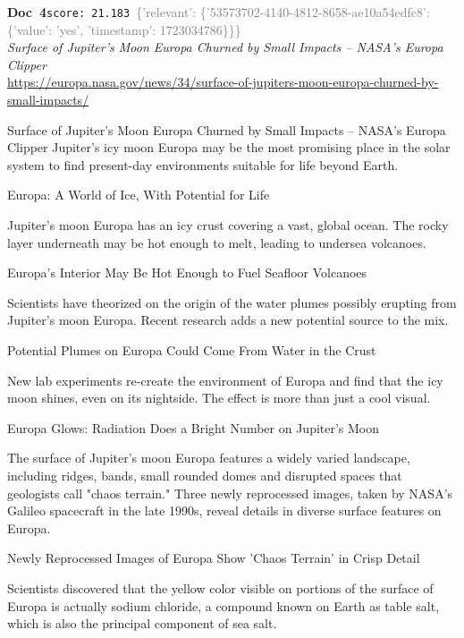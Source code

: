 \documentclass[a4paper,11pt]{article}
\begin{document}
\begin{docenv}
{\footnotesize\textcolor{doccolor}{\textbf{Doc~4}}}\hfill{\tiny\texttt{score:~21.183}}\ {\tiny\textcolor{gray}{\{'relevant': \{'53573702-4140-4812-8658-ae10a54edfc8': \{'value': 'yes', 'timestamp': 1723034786\}\}\}}}\\[3pt]
{\small\textit{Surface of Jupiter's Moon Europa Churned by Small Impacts – NASA's Europa Clipper}}\\[2pt]
{\tiny\url{https://europa.nasa.gov/news/34/surface-of-jupiters-moon-europa-churned-by-small-impacts/}}\\[4pt]
{\footnotesize Surface of Jupiter's Moon Europa Churned by Small Impacts – NASA's Europa Clipper
Jupiter’s icy moon Europa may be the most promising place in the solar system to find present-day environments suitable for life beyond Earth. 

Europa: A World of Ice, With Potential for Life

Jupiter’s moon Europa has an icy crust covering a vast, global ocean. The rocky layer underneath may be hot enough to melt, leading to undersea volcanoes.

Europa's Interior May Be Hot Enough to Fuel Seafloor Volcanoes

Scientists have theorized on the origin of the water plumes possibly erupting from Jupiter's moon Europa. Recent research adds a new potential source to the mix.

Potential Plumes on Europa Could Come From Water in the Crust

New lab experiments re-create the environment of Europa and find that the icy moon shines, even on its nightside. The effect is more than just a cool visual.

Europa Glows: Radiation Does a Bright Number on Jupiter's Moon

The surface of Jupiter's moon Europa features a widely varied landscape, including ridges, bands, small rounded domes and disrupted spaces that geologists call "chaos terrain." Three newly reprocessed images, taken by NASA's Galileo spacecraft in the late 1990s, reveal details in diverse surface features on Europa.

Newly Reprocessed Images of Europa Show 'Chaos Terrain' in Crisp Detail

Scientists discovered that the yellow color visible on portions of the surface of Europa is actually sodium chloride, a compound known on Earth as table salt, which is also the principal component of sea salt.

}
\end{docenv}
\end{document}
